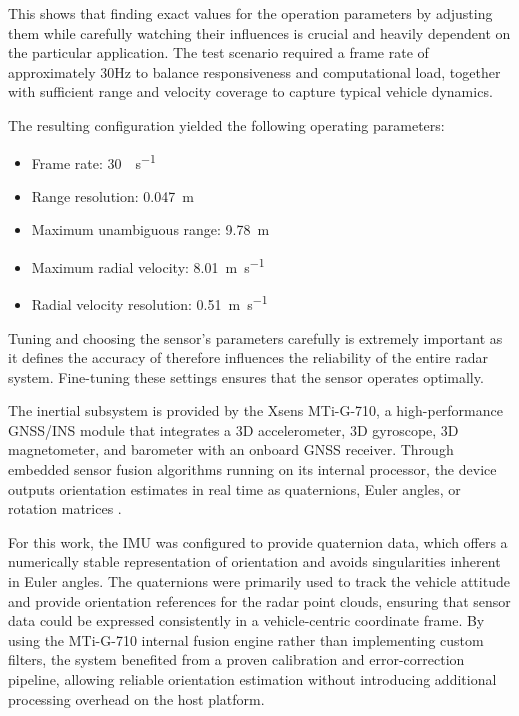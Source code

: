This shows that finding exact values for the operation parameters by adjusting them while carefully watching their influences is crucial and heavily dependent on the particular application.
The test scenario required a frame rate of approximately 30Hz to balance responsiveness and computational load, together with sufficient range and velocity coverage to capture typical vehicle dynamics.

The resulting configuration yielded the following operating parameters:
\begin{itemize}
\item Frame rate: \SI{30}{\frame\per\second}
\item Range resolution: \SI{0.047}{\meter}
\item Maximum unambiguous range: \SI{9.78}{\meter}
\item Maximum radial velocity: \SI{8.01}{\meter\per\second}
\item Radial velocity resolution: \SI{0.51}{\meter\per\second}
\end{itemize}

Tuning and choosing the sensor's parameters carefully is extremely important as it defines the accuracy of therefore influences the reliability of the entire radar system.
Fine-tuning these settings ensures that the sensor operates optimally.

The inertial subsystem is provided by the Xsens MTi-G-710, a high-performance GNSS/INS module that integrates a 3D accelerometer, 3D gyroscope, 3D magnetometer, and barometer with an onboard GNSS receiver.  
Through embedded sensor fusion algorithms running on its internal processor, the device outputs orientation estimates in real time as quaternions, Euler angles, or rotation matrices \cite{mti710_manual}.  

For this work, the IMU was configured to provide quaternion data, which offers a numerically stable representation of orientation and avoids singularities inherent in Euler angles.  
The quaternions were primarily used to track the vehicle attitude and provide orientation references for the radar point clouds, ensuring that sensor data could be expressed consistently in a vehicle-centric coordinate frame.  
By using the MTi-G-710 internal fusion engine rather than implementing custom filters, the system benefited from a proven calibration and error-correction pipeline, allowing reliable orientation estimation without introducing additional processing overhead on the host platform.  

